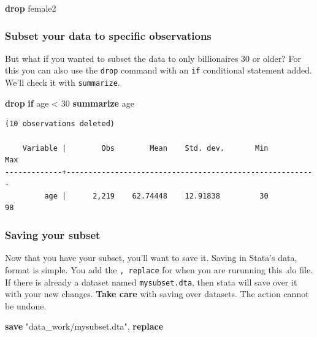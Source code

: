 \documentclass[
]{book}
\newenvironment{Shaded}{\begin{snugshade}}{\end{snugshade}}
\newcommand{\KeywordTok}[1]{\textcolor[rgb]{0.13,0.29,0.53}{\textbf{#1}}}
\newcommand{\NormalTok}[1]{#1}
\newcommand{\StringTok}[1]{\textcolor[rgb]{0.31,0.60,0.02}{#1}}
\begin{document}
\begin{Shaded}
\begin{Highlighting}[]
\KeywordTok{drop}\NormalTok{ female2}
\end{Highlighting}
\end{Shaded}

\hypertarget{dropif}{%
\subsubsection*{Subset your data to specific observations}\label{dropif}}

But what if you wanted to subset the data to only billionaires 30 or older? For this you can also use the \texttt{drop} command with an \texttt{if} conditional statement added. We'll check it with \texttt{summarize}.

\begin{Shaded}
\begin{Highlighting}[]
\KeywordTok{drop} \KeywordTok{if}\NormalTok{ age \textless{} 30 }
\KeywordTok{summarize}\NormalTok{ age }
\end{Highlighting}
\end{Shaded}

\begin{verbatim}
(10 observations deleted)

    Variable |        Obs        Mean    Std. dev.       Min        Max
-------------+---------------------------------------------------------
         age |      2,219    62.74448    12.91838         30         98
\end{verbatim}

\hypertarget{saving}{%
\subsubsection*{Saving your subset}\label{saving}}

Now that you have your subset, you'll want to save it. Saving in Stata's data, format is simple. You add the \texttt{,\ replace} for when you are rurunning this .do file. If there is already a dataset named \texttt{mysubset.dta}, then stata will save over it with your new changes. \textbf{Take care} with saving over datasets. The action cannot be undone.

\begin{Shaded}
\begin{Highlighting}[]
\KeywordTok{save} \StringTok{"data\_work/mysubset.dta"}\NormalTok{, }\KeywordTok{replace}
\end{Highlighting}
\end{Shaded}
\end{document}
